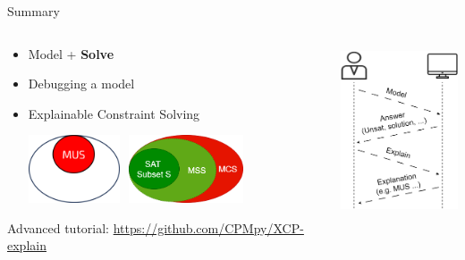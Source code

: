 \documentclass{cons-beamer}
\begin{document}
\begin{frame}{Summary}
  \begin{columns}
    \begin{column}{0.7\textwidth}
      \begin{itemize}
        \item Model + \textbf{Solve}
              \vspace{0.5cm}

        \item Debugging a model
              \vspace{0.5cm}

        \item Explainable Constraint Solving \vfill
        
              \includegraphics[height=20mm]{images/texpl_img/mus.png}
              $ $
              \includegraphics[height=20mm]{images/texpl_img/mcs_grow.png}
      \end{itemize} \vfill
      
      Advanced tutorial: \url{https://github.com/CPMpy/XCP-explain}
    \end{column}

    \begin{column}{0.3\textwidth}
      \begin{center}
        \includegraphics[height=50mm]{images/texpl_img/interaction_figure4.png}
      \end{center}
    \end{column}
  \end{columns}
\end{frame}
\end{document}
